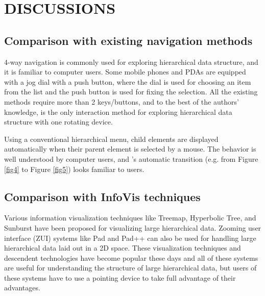 \documentclass{article}
\begin{document}
\section*{DISCUSSIONS}

\subsection{Comparison with existing navigation methods}

4-way navigation is commonly used for exploring hierarchical data structure,
and it is familiar to computer users.
Some mobile phones and PDAs are equipped with a jog dial with a push button,
where the dial is used for choosing an item from the list and 
the push button is used for fixing the selection.
All the existing methods require more than 2 keys/buttons, and
to the best of the authors' knowledge,
{\ST} is the only interaction method for exploring hierarchical data structure
with one rotating device.

Using a conventional hierarchical menu,
child elements are displayed automatically when their parent element is selected by a mouse.
The behavior is well understood by computer users,
and {\ST}'s automatic transition (e.g. from Figure \ref{fig4} to Figure \ref{fig5})
looks familiar to users.

\subsection{Comparison with InfoVis techniques}

Various information visualization techniques like
Treemap\cite{Johnson:1991:TSA:949607.949654},
Hyperbolic Tree\cite{Lamping:1995:FTB:223904.223956},
and Sunburst\cite{Stasko:2000:FDN:857190.857683}
have been proposed for visualizing large hierarchical data.
Zooming user interface (ZUI) systems like
Pad\cite{Perlin:1993:PAA:166117.166125} and
Pad++\cite{Bederson:1994:PZG:192426.192435}
can also be used for handling large hierarchical data laid out in a 2D space.
%
These visualization techniques and descendent technologies have become popular these days and
all of these systems are useful for understanding the structure of
large hierarchical data, but users of these systems have to use a pointing device
to take full advantage of their advantages.

\end{document}
